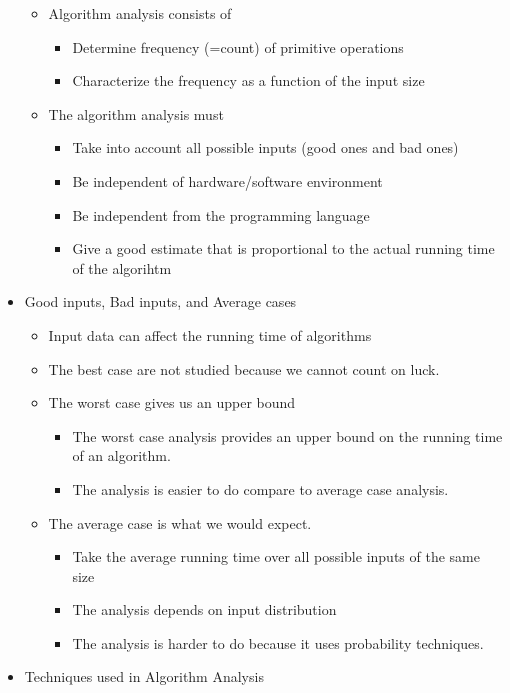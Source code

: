 \documentclass[12pt, a4paper]{article}
\begin{document}
\begin{itemize}
	\begin{itemize}
		\item Algorithm analysis consists of
		\begin{itemize}
			\item Determine frequency (=count) of primitive operations
			\item Characterize the frequency as a function of the input size
		\end{itemize}
		\item The algorithm analysis must
		\begin{itemize}
			\item Take into account all possible inputs (good ones and bad ones)
			\item Be independent of hardware/software environment
			\item Be independent from the programming language
			\item Give a good estimate that is proportional to the actual running time of the algorihtm
		\end{itemize}
	\end{itemize}
	\item Good inputs, Bad inputs, and Average cases
	\begin{itemize}
		\item Input data can affect the running time of algorithms
		\item The best case are not studied because we cannot count on luck.
		\item The worst case gives us an upper bound
		\begin{itemize}
			\item The worst case analysis provides an upper bound on the running time of an algorithm.
			\item The analysis is easier to do compare to average case analysis.
		\end{itemize}
		\item The average case is what we would expect.
		\begin{itemize}
			\item Take the average running time over all possible inputs of the same size
			\item The analysis depends on input distribution
			\item The analysis is harder to do because it uses probability techniques. 
		\end{itemize} 
	\end{itemize}
	\item Techniques used in Algorithm Analysis

\end{itemize}
\end{document}
